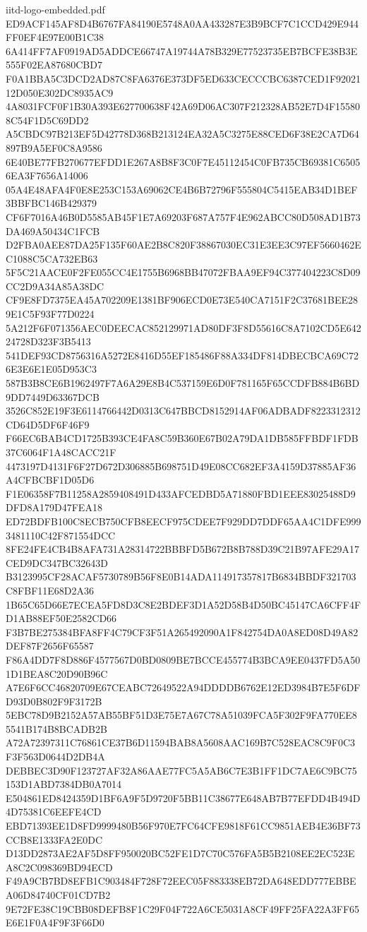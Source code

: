 \begin{filecontents*}[overwrite]{iitd-logo-embedded.pdf}
ED9ACF145AF8D4B6767FA84190E5748A0AA433287E3B9BCF7C1CCD429E944FF0EF4E97E00B1C38
6A414FF7AF0919AD5ADDCE66747A19744A78B329E77523735EB7BCFE38B3E555F02EA87680CBD7
F0A1BBA5C3DCD2AD87C8FA6376E373DF5ED633CECCCBC6387CED1F9202112D050E302DC8935AC9
4A8031FCF0F1B30A393E627700638F42A69D06AC307F212328AB52E7D4F155808C54F1D5C69DD2
A5CBDC97B213EF5D42778D368B213124EA32A5C3275E88CED6F38E2CA7D64897B9A5EF0C8A9586
6E40BE77FB270677EFDD1E267A8B8F3C0F7E45112454C0FB735CB69381C65056EA3F7656A14006
05A4E48AFA4F0E8E253C153A69062CE4B6B72796F555804C5415EAB34D1BEF3BBFBC146B429379
CF6F7016A46B0D5585AB45F1E7A69203F687A757F4E962ABCC80D508AD1B73DA469A50434C1FCB
D2FBA0AEE87DA25F135F60AE2B8C820F38867030EC31E3EE3C97EF5660462EC1088C5CA732EB63
5F5C21AACE0F2FE055CC4E1755B6968BB47072FBAA9EF94C377404223C8D09CC2D9A34A85A38DC
CF9E8FD7375EA45A702209E1381BF906ECD0E73E540CA7151F2C37681BEE289E1C5F93F77D0224
5A212F6F071356AEC0DEECAC852129971AD80DF3F8D55616C8A7102CD5E64224728D323F3B5413
541DEF93CD8756316A5272E8416D55EF185486F88A334DF814DBECBCA69C726E3E6E1E05D953C3
587B3B8CE6B1962497F7A6A29E8B4C537159E6D0F781165F65CCDFB884B6BD9DD7449D63367DCB
3526C852E19F3E6114766442D0313C647BBCD8152914AF06ADBADF8223312312CD64D5DF6F46F9
F66EC6BAB4CD1725B393CE4FA8C59B360E67B02A79DA1DB585FFBDF1FDB37C6064F1A48CACC21F
4473197D4131F6F27D672D306885B698751D49E08CC682EF3A4159D37885AF36A4CFBCBF1D05D6
F1E06358F7B11258A2859408491D433AFCEDBD5A71880FBD1EEE83025488D9DFD8A179D47FEA18
ED72BDFB100C8ECB750CFB8EECF975CDEE7F929DD7DDF65AA4C1DFE9993481110C42F871554DCC
8FE24FE4CB4B8AFA731A28314722BBBFD5B672B8B788D39C21B97AFE29A17CED9DC347BC32643D
B3123995CF28ACAF5730789B56F8E0B14ADA114917357817B6834BBDF321703C8FBF11E68D2A36
1B65C65D66E7ECEA5FD8D3C8E2BDEF3D1A52D58B4D50BC45147CA6CFF4FD1AB88EF50E2582CD66
F3B7BE275384BFA8FF4C79CF3F51A265492090A1F842754DA0A8ED08D49A82DEF87F2656F65587
F86A4DD7F8D886F4577567D0BD0809BE7BCCE455774B3BCA9EE0437FD5A501D1BEA8C20D90B96C
A7E6F6CC46820709E67CEABC72649522A94DDDDB6762E12ED3984B7E5F6DFD93D0B802F9F3172B
5EBC78D9B2152A57AB55BF51D3E75E7A67C78A51039FCA5F302F9FA770EE85541B174B8BCADB2B
A72A72397311C76861CE37B6D11594BAB8A5608AAC169B7C528EAC8C9F0C3F3F563D0644D2DB4A
DEBBEC3D90F123727AF32A86AAE77FC5A5AB6C7E3B1FF1DC7AE6C9BC75153D1ABD7384DB0A7014
E504861ED8424359D1BF6A9F5D9720F5BB11C38677E648AB7B77EFDD4B494D4D75381C6EEFE4CD
EBD71393EE1D8FD9999480B56F970E7FC64CFE9818F61CC9851AEB4E36BF73CCB8E1333FA2E0DC
D13DD2873AE2AF5D8FF950020BC52FE1D7C70C576FA5B5B2108EE2EC523EA8C2C098369BD94ECD
F49A9CB7BD8EFB1C903484F728F72EEC05F883338EB72DA648EDD777EBBEA06D84740CF01CD7B2
9E72FE38C19CBB08DEFB8F1C29F04F722A6CE5031A8CF49FF25FA22A3FF65E6E1F0A4F9F3F66D0

\end{filecontents*}
